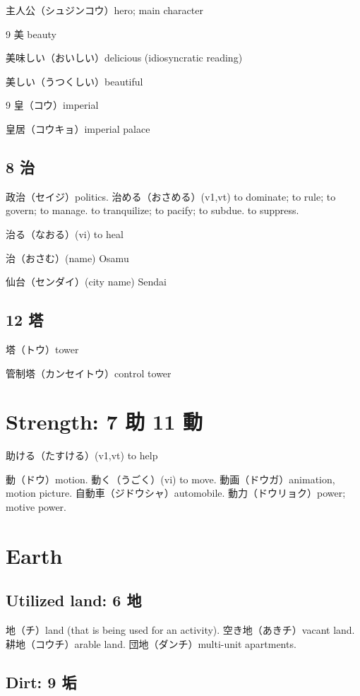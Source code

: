 主人公（シュジンコウ）hero; main character

9 美 beauty

美味しい（おいしい）delicious (idiosyncratic reading)

美しい（うつくしい）beautiful

9 皇（コウ）imperial

皇居（コウキョ）imperial palace

\subsection{8 治}

政治（セイジ）politics.
治める（おさめる）(v1,vt)
to dominate; to rule; to govern; to manage.
to tranquilize; to pacify; to subdue.
to suppress.

治る（なおる）(vi) to heal

治（おさむ）(name) Osamu

仙台（センダイ）(city name) Sendai

\subsection{12 塔}

塔（トウ）tower

管制塔（カンセイトウ）control tower

\section{Strength: 7 助 11 動}

助ける（たすける）(v1,vt) to help

動（ドウ）motion.
動く（うごく）(vi) to move.
動画（ドウガ）animation, motion picture.
自動車（ジドウシャ）automobile.
動力（ドウリョク）power; motive power.

\section{Earth}

\subsection{Utilized land: 6 地}

地（チ）land (that is being used for an activity).
空き地（あきチ）vacant land.
耕地（コウチ）arable land.
団地（ダンチ）multi-unit apartments.

\subsection{Dirt: 9 垢}

